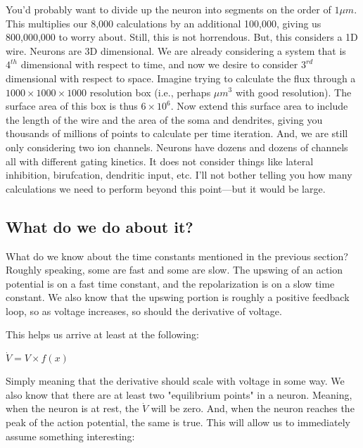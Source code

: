 \documentclass[12pt]{amsart}
\begin{document}
You'd probably want to divide up the neuron into segments on the order of $1\mu m$. This multiplies our 8,000 calculations by an additional 100,000, giving us 800,000,000 to worry about. Still, this is not horrendous. But, this considers a 1D wire. Neurons are 3D dimensional. We are already considering a system that is $4^{th}$ dimensional with respect to time, and now we desire to consider $3^{rd}$ dimensional with respect to space. Imagine trying to calculate the flux through a $1000 \times 1000 \times 1000$ resolution box (i.e., perhaps $\mu m^3$ with good resolution). The surface area of this box is thus $6\times 10^6$. Now extend this surface area to include the length of the wire and the area of the soma and dendrites, giving you thousands of millions of points to calculate per time iteration. And, we are still only considering two ion channels. Neurons have dozens and dozens of channels all with different gating kinetics. It does not consider things like lateral inhibition, birufcation, dendritic input, etc. I'll not bother telling you how many calculations we need to perform beyond this point---but it would be large. 

\subsection{What do we do about it?} What do we know about the time constants mentioned in the previous section? Roughly speaking, some are fast and some are slow. The upswing of an action potential is on a fast time constant, and the repolarization is on a slow time constant. We also know that the upswing portion is roughly a positive feedback loop, so as voltage increases, so should the derivative of voltage.\newline

This helps us arrive at least at the following: 

\bigskip

\begin{center}

    $\dot{V} = V \times f(x)$
    
\end{center}

\bigskip

Simply meaning that the derivative should scale with voltage in some way. We also know that there are at least two "equilibrium points" in a neuron. Meaning, when the neuron is at rest, the $\dot{V}$ will be zero. And, when the neuron reaches the peak of the action potential, the same is true. This will allow us to immediately assume something interesting:
\end{document}

